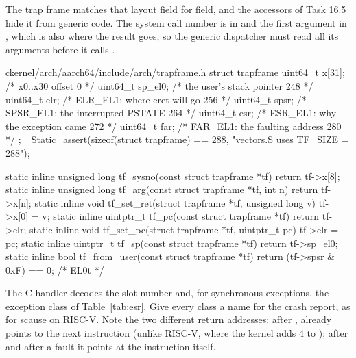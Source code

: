 \documentclass[11pt,a4paper]{article}
\begin{document}
The trap frame matches that layout field for field, and the accessors of Task 16.5 hide it from generic code.
The system call number is in  and the first argument in , which is also where the result goes, so
the generic dispatcher must read all its arguments before it calls .

\begin{lst}{c}{kernel/arch/aarch64/include/arch/trapframe.h}
struct trapframe {
    uint64_t x[31];             /* x0..x30                     offset   0 */
    uint64_t sp_el0;            /* the user's stack pointer           248 */
    uint64_t elr;               /* ELR_EL1: where eret will go        256 */
    uint64_t spsr;              /* SPSR_EL1: the interrupted PSTATE   264 */
    uint64_t esr;               /* ESR_EL1: why the exception came    272 */
    uint64_t far;               /* FAR_EL1: the faulting address      280 */
};
_Static_assert(sizeof(struct trapframe) == 288, "vectors.S uses TF_SIZE = 288");

static inline unsigned long tf_sysno(const struct trapframe *tf)         { return tf->x[8]; }
static inline unsigned long tf_arg(const struct trapframe *tf, int n)    { return tf->x[n]; }
static inline void tf_set_ret(struct trapframe *tf, unsigned long v)     { tf->x[0] = v; }
static inline uintptr_t tf_pc(const struct trapframe *tf)                { return tf->elr; }
static inline void tf_set_pc(struct trapframe *tf, uintptr_t pc)         { tf->elr = pc; }
static inline uintptr_t tf_sp(const struct trapframe *tf)                { return tf->sp_el0; }
static inline bool tf_from_user(const struct trapframe *tf) { return (tf->spsr & 0xF) == 0; } /* EL0t */
\end{lst}

The C handler decodes the slot number and, for synchronous exceptions, the exception class of
Table~\ref{tab:esr}. Give every class a name for the crash report, as for scause on RISC-V. Note the two
different return addresses: after ,  already points to the next instruction (unlike RISC-V,
where the kernel adds 4 to ); after  and after a fault it points at the instruction itself.
\end{document}
